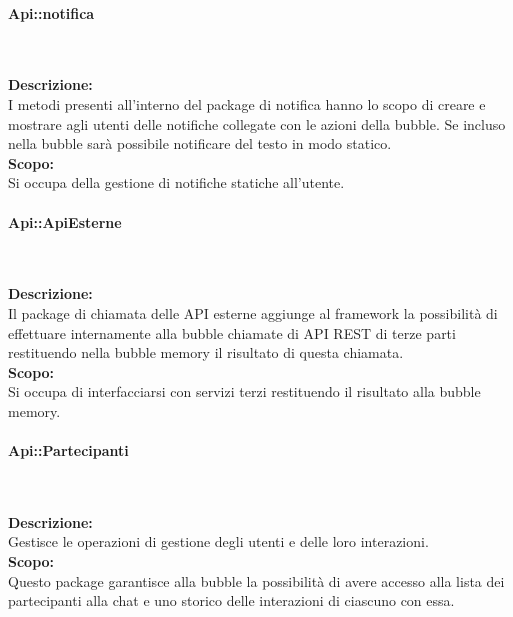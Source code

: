 \begin{samepage}
\paragraph{Api::notifica}\label{api-notifica}\mbox{}\\
\end{samepage}
\textbf{Descrizione:}\\ 
I metodi presenti all'interno del package di notifica hanno lo scopo di creare e mostrare agli utenti delle notifiche collegate con le azioni della bubble. Se incluso nella bubble sarà possibile notificare del testo in modo statico.\\
\textbf{Scopo:}\\
Si occupa della gestione di notifiche statiche all'utente.\\

\begin{samepage}
\paragraph{Api::ApiEsterne}\label{api-esterne}\mbox{}\\
\end{samepage}
\textbf{Descrizione:}\\ 
Il package di chiamata delle API esterne aggiunge al framework la possibilità di effettuare internamente alla bubble chiamate di API REST di terze parti restituendo nella bubble memory il risultato di questa chiamata. \\
\textbf{Scopo:}\\
Si occupa di interfacciarsi con servizi terzi restituendo il risultato alla bubble memory.\\

\begin{samepage}
\paragraph{Api::Partecipanti}\label{api-partecipanti}\mbox{}\\
\end{samepage}
\textbf{Descrizione:}\\ 
Gestisce le operazioni di gestione degli utenti e delle loro interazioni.\\
\textbf{Scopo:}\\
Questo package garantisce alla bubble la possibilità di avere accesso alla lista dei partecipanti alla chat e uno storico delle interazioni di ciascuno con essa.


